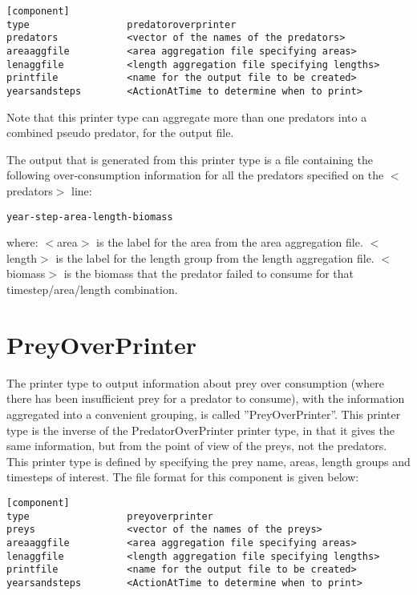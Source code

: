 \documentclass [a4paper, 10pt]{book}
\begin{document}
{\small\begin{verbatim}
[component]
type                 predatoroverprinter
predators            <vector of the names of the predators>
areaaggfile          <area aggregation file specifying areas>
lenaggfile           <length aggregation file specifying lengths>
printfile            <name for the output file to be created>
yearsandsteps        <ActionAtTime to determine when to print>
\end{verbatim}}

Note that this printer type can aggregate more than one predators into a combined pseudo predator, for the output file.

\bigskip
The output that is generated from this printer type is a file containing the following over-consumption information for all the predators specified on the $<$predators$>$ line:

{\small\begin{verbatim}
year-step-area-length-biomass
\end{verbatim}}

where:\newline
$<$area$>$ is the label for the area from the area aggregation file.\newline
$<$length$>$ is the label for the length group from the length aggregation file.\newline
$<$biomass$>$ is the biomass that the predator failed to consume for that timestep/area/length combination.

\section{PreyOverPrinter}\label{sec:preyoverprinter}
The printer type to output information about prey over consumption (where there has been insufficient prey for a predator to consume), with the information aggregated into a convenient grouping, is called ''PreyOverPrinter''.  This printer type is the inverse of the PredatorOverPrinter printer type, in that it gives the same information, but from the point of view of the preys, not the predators.  This printer type is defined by specifying the prey name, areas, length groups and timesteps of interest.  The file format for this component is given below:

{\small\begin{verbatim}
[component]
type                 preyoverprinter
preys                <vector of the names of the preys>
areaaggfile          <area aggregation file specifying areas>
lenaggfile           <length aggregation file specifying lengths>
printfile            <name for the output file to be created>
yearsandsteps        <ActionAtTime to determine when to print>
\end{verbatim}}
\end{document}
